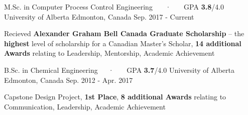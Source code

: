

\begin{cventries}

  \cventry
    {M.Sc. in Computer Process Control Engineering ~~~·~~~ GPA \textbf{3.8}/4.0} %
    {University of Alberta} %
    {Edmonton, Canada} %
    {Sep. 2017 - Current} %
    {
      \begin{cvitems} %
        \item {Recieved \textbf{Alexander Graham Bell Canada Graduate Scholarship} – the \textbf{highest} level of scholarship for a Canadian Master's Scholar, \textbf{14 additional Awards} relating to Leadership, Mentorship, Academic Achievement }
      \end{cvitems}
    }

\cventry
{B.Sc. in Chemical Engineering~~~·~~~ GPA \textbf{3.7}/4.0} %
{University of Alberta} %
{Edmonton, Canada} %
{Sep. 2012 - Apr. 2017} %
{
	\begin{cvitems} %
		\item {Capstone Design Project, \textbf{1st Place}, \textbf{8 additional Awards} relating to Communication, Leadership, Academic Achievement}
	\end{cvitems}
}

\end{cventries}
